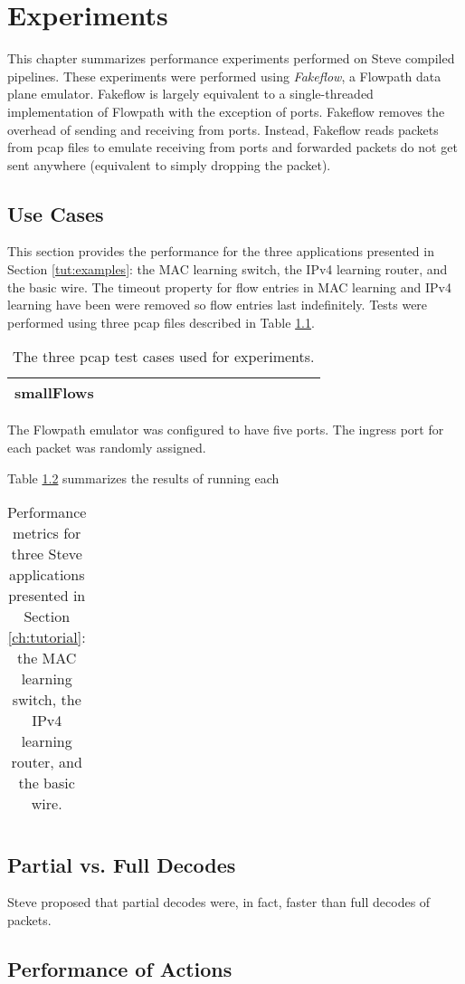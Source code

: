 \chapter{Experiments} \label{ch:experiments}

This chapter summarizes performance experiments performed on Steve compiled pipelines. These experiments were performed using \textit{Fakeflow}, a Flowpath data plane emulator. Fakeflow is largely equivalent to a single-threaded implementation of Flowpath with the exception of ports. Fakeflow removes the overhead of sending and receiving from ports. Instead, Fakeflow reads packets from pcap files to emulate receiving from ports and forwarded packets do not get sent anywhere (equivalent to simply dropping the packet).

\section{Use Cases} \label{exp:use_cases}

This section provides the performance for the three applications presented in Section \ref{tut:examples}: the MAC learning switch, the IPv4 learning router, and the basic wire. The timeout property for flow entries in MAC learning and IPv4 learning have been were removed so flow entries last indefinitely. Tests were performed using three pcap files described in Table \ref{tbl:pcap}.

\begin{table}
\begin{center}
\begin{tabular}{| p{0.3\linewidth} | p{0.7\linewidth} |}
\hline
smallFlows & \\
\hline
\end{tabular}
\end{center}
\caption{The three pcap test cases used for experiments.}
\label{tbl:pcap}
\end{table}

The Flowpath emulator was configured to have five ports. The ingress port for each packet was randomly assigned.

Table \ref{tbl:use_stats} summarizes the results of running each 

\begin{table}
\begin{center}
\begin{tabular}{| p{0.3\linewidth} | p{0.7\linewidth} |}

\end{tabular}
\end{center}
\caption{Performance metrics for three Steve applications presented in Section \ref{ch:tutorial}: the MAC learning switch, the IPv4 learning router, and the basic wire.}
\label{tbl:use_stats}
\end{table}

\section{Partial vs. Full Decodes} \label{exp:decode_comparison}

Steve proposed that partial decodes were, in fact, faster than full decodes of packets.

\section{Performance of Actions} \label{exp:action_performance}
